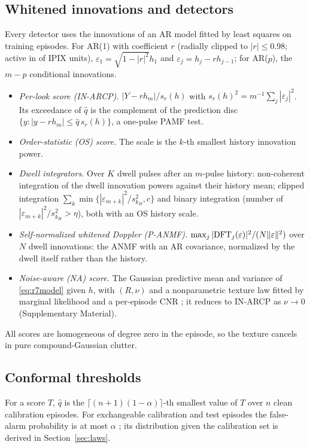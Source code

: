 \documentclass[journal]{IEEEtran}
\begin{document}
\subsection{Whitened innovations and detectors}
Every detector uses the innovations of an AR model fitted by least squares on training episodes. For AR(1) with coefficient $r$ (radially clipped to $|r|\le0.98$; active in \FitClampBinding{} of \NUnitsConf{} IPIX units), $\varepsilon_1=\sqrt{1-|r|^2}h_1$ and $\varepsilon_j=h_j-rh_{j-1}$; for AR($p$), the $m-p$ conditional innovations.
\begin{itemize}[leftmargin=*,itemsep=1pt]
\item \emph{Per-look score (IN-ARCP).} $|Y-rh_m|/s_r(h)$ with $s_r(h)^2=m^{-1}\sum_j|\varepsilon_j|^2$. Its exceedance of $\widehat q$ is the complement of the prediction disc $\{y:|y-rh_m|\le\widehat q\,s_r(h)\}$, a one-pulse PAMF test.
\item \emph{Order-statistic (OS) score.} The scale is the $k$-th smallest history innovation power.
\item \emph{Dwell integrators.} Over $K$ dwell pulses after an $m$-pulse history: non-coherent integration of the dwell innovation powers against their history mean; clipped integration $\sum_k\min\{|\varepsilon_{m+k}|^2/s_{k_H}^2,c\}$ and binary integration (number of $|\varepsilon_{m+k}|^2/s_{k_H}^2>\eta$), both with an OS history scale.
\item \emph{Self-normalized whitened Doppler (P-ANMF).} $\max_j|{\rm DFT}_j(\varepsilon)|^2/(N\|\varepsilon\|^2)$ over $N$ dwell innovations: the ANMF with an AR covariance, normalized by the dwell itself rather than the history.
\item \emph{Noise-aware (NA) score.} The Gaussian predictive mean and variance of \eqref{eq:r7model} given $h$, with $(R,\nu)$ and a nonparametric texture law fitted by marginal likelihood and a per-episode CNR \cite{ignatiadis2025}; it reduces to IN-ARCP as $\nu\to0$ (Supplementary Material).
\end{itemize}
All scores are homogeneous of degree zero in the episode, so the texture cancels in pure compound-Gaussian clutter.

\subsection{Conformal thresholds}
For a score $T$, $\widehat q$ is the $\lceil(n+1)(1-\alpha)\rceil$-th smallest value of $T$ over $n$ clean calibration episodes. For exchangeable calibration and test episodes the false-alarm probability is at most $\alpha$ \cite{lei2018,bates2023}; its distribution given the calibration set is derived in Section~\ref{sec:laws}.
\end{document}
